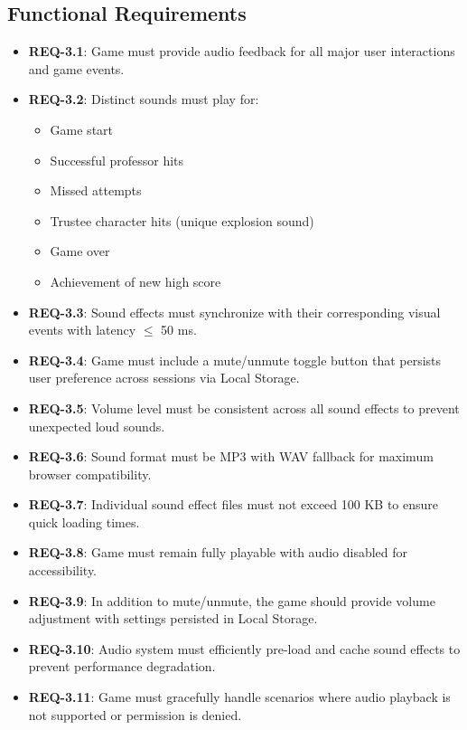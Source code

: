 \documentclass[11pt]{scrreprt}
\begin{document}
\subsection{Functional Requirements}
\begin{itemize}
  \item \textbf{REQ-3.1}: Game must provide audio feedback for all major user interactions and game events.
  \item \textbf{REQ-3.2}: Distinct sounds must play for:
    \begin{itemize}
      \item Game start
      \item Successful professor hits
      \item Missed attempts
      \item Trustee character hits (unique explosion sound)
      \item Game over
      \item Achievement of new high score
    \end{itemize}
  \item \textbf{REQ-3.3}: Sound effects must synchronize with their corresponding visual events with latency $\leq$ 50 ms.
  \item \textbf{REQ-3.4}: Game must include a mute/unmute toggle button that persists user preference across sessions via Local Storage.
  \item \textbf{REQ-3.5}: Volume level must be consistent across all sound effects to prevent unexpected loud sounds.
  \item \textbf{REQ-3.6}: Sound format must be MP3 with WAV fallback for maximum browser compatibility.
  \item \textbf{REQ-3.7}: Individual sound effect files must not exceed 100 KB to ensure quick loading times.
  \item \textbf{REQ-3.8}: Game must remain fully playable with audio disabled for accessibility.
  \item \textbf{REQ-3.9}: In addition to mute/unmute, the game should provide volume adjustment with settings persisted in Local Storage.
  \item \textbf{REQ-3.10}: Audio system must efficiently pre-load and cache sound effects to prevent performance degradation.
  \item \textbf{REQ-3.11}: Game must gracefully handle scenarios where audio playback is not supported or permission is denied.
\end{itemize}
\end{document}
